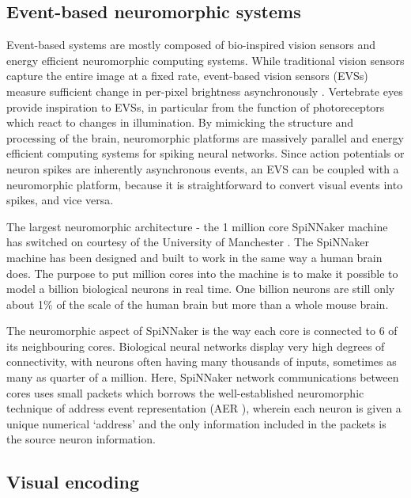 \documentclass[letterpaper, 10 pt, conference]{ieeeconf}  %
\begin{document}
\subsection{Event-based neuromorphic systems}

Event-based systems are mostly composed of bio-inspired vision sensors and energy efficient neuromorphic computing systems. 
While traditional vision sensors capture the entire image at a fixed rate, event-based vision sensors (EVSs) measure sufficient change in per-pixel brightness asynchronously \cite{Gallego2019}.
Vertebrate eyes provide inspiration to EVSs, in particular from the function of photoreceptors which react to changes in illumination.
By mimicking the structure and processing of the brain, neuromorphic platforms are massively parallel and energy efficient computing systems for spiking neural networks.
Since action potentials or neuron spikes are inherently asynchronous events, an EVS can be coupled with a neuromorphic platform, because it is straightforward to convert visual events into spikes, and vice versa.

The largest neuromorphic architecture - the 1 million core SpiNNaker machine has switched on courtesy of the University of Manchester \cite{Furber2020}. 
The SpiNNaker machine has been designed and built to work in the same way a human brain does. 
The purpose to put million cores into the machine is to make it possible to model a billion biological neurons in real time. 
One billion neurons are still only about 1\% of the scale of the human brain but more than a whole mouse brain.

The neuromorphic aspect of SpiNNaker is the way each core is connected to 6 of its neighbouring cores. 
Biological neural networks display very high degrees of connectivity, with neurons often having many thousands of inputs, sometimes as many as quarter of a million. 
Here, SpiNNaker network communications between cores uses small packets which borrows the well-established neuromorphic technique of address event representation (AER \cite{Mahowald1992}), wherein each neuron is given a unique numerical ‘address’ and the only information included in the packets is the source neuron information.

\subsection{Visual encoding}
\end{document}
